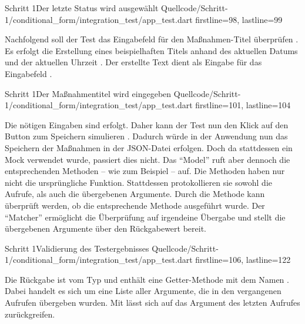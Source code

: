 \begin{alexlisting}{Schritt 1}{Der letzte Status wird ausgewählt}
  {Quellcode/Schritt-1/conditional_form/integration_test/app_test.dart}
  {firstline=98, lastline=99}
  \label{lst:Schritt1LetzterStatusWirdAusgewählt}
\end{alexlisting}

Nachfolgend soll der Test das Eingabefeld für den Maßnahmen-Titel überprüfen \Lst{\ref{lst:Schritt1MassnahmentitelWirdEingegeben}}.
Es erfolgt die Erstellung eines beispielhaften Titels anhand des aktuellen Datums und der aktuellen Uhrzeit .
Der erstellte Text dient als Eingabe für das Eingabefeld . 

\begin{alexlisting}{Schritt 1}{Der Maßnahmentitel wird eingegeben}
  {Quellcode/Schritt-1/conditional_form/integration_test/app_test.dart}
  {firstline=101, lastline=104}
  \label{lst:Schritt1MassnahmentitelWirdEingegeben}
\end{alexlisting}

Die nötigen Eingaben sind erfolgt.
Daher kann der Test nun den Klick auf den Button zum Speichern simulieren .
Dadurch würde in der Anwendung nun das Speichern der Maßnahmen in der JSON-Datei erfolgen.
Doch da stattdessen ein Mock verwendet wurde, passiert dies nicht.
Das \enquote{Model} ruft aber dennoch die entsprechenden Methoden -- wie zum Beispiel  -- auf.
Die Methoden haben nur nicht die ursprüngliche Funktion.
Stattdessen protokollieren sie sowohl die Aufrufe, als auch die übergebenen Argumente.
Durch die Methode   kann überprüft werden, ob die entsprechende Methode  ausgeführt wurde.
Der \enquote{Matcher}  ermöglicht die Überprüfung auf irgendeine Übergabe und stellt die übergebenen Argumente über den Rückgabewert bereit.

\begin{alexlisting}{Schritt 1}{Validierung des Testergebnisses}
  {Quellcode/Schritt-1/conditional_form/integration_test/app_test.dart}
  {firstline=106, lastline=122}
\end{alexlisting}

Die Rückgabe ist vom Typ  und enthält eine Getter-Methode mit dem Namen .
Dabei handelt es sich um eine Liste aller Argumente, die in den vergangenen Aufrufen übergeben wurden.
Mit  lässt sich auf das Argument des letzten Aufrufes zurückgreifen.

